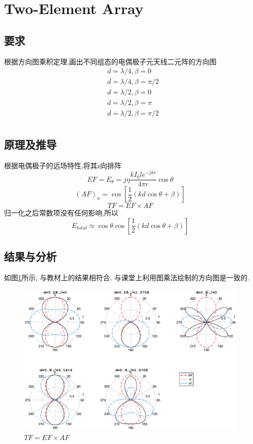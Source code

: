 


\section{Two-Element Array}
\subsection{要求}
\noindent 根据方向图乘积定理,画出不同组态的电偶极子元天线二元阵的方向图
\begin{align*}
&d=\lambda/4, \beta=0\\
&d=\lambda/4, \beta=\pi/2\\
&d=\lambda/2, \beta=0\\
&d=\lambda/2, \beta=\pi\\
&d=\lambda/2, \beta=\pi/2\\
\end{align*}	

\subsection{原理及推导}
根据电偶极子的远场特性,将其z向排阵
\begin{equation}
EF=E_\theta=j\eta\dfrac{kI_0le^{-jkr}}{4\pi r}\cos\theta
\end{equation}
\begin{equation}
(AF)_n=\cos\left[\dfrac{1}{2}(kd\cos\theta+\beta)\right]
\end{equation}
\begin{equation*}
TF=EF\times AF
\end{equation*}
归一化之后常数项没有任何影响,所以
\begin{equation}
E_{total}\simeq \cos\theta\cos\left[\dfrac{1}{2}(kd\cos\theta+\beta)\right]
\end{equation}
\subsection{结果与分析}
如图\ref{fig:2element}所示, 与教材上的结果相符合. 与课堂上利用图乘法绘制的方向图是一致的. 
\begin{figure}[!ht]
	\centering
	\includegraphics[width=\textwidth]{array2element.eps}
	\caption{$TF=EF\times AF$} \label{fig:2element}
\end{figure}
\newpage
